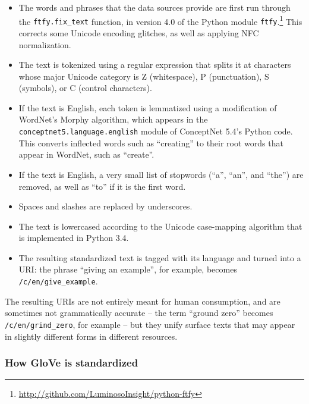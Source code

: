 \documentclass[letterpaper]{article}
\begin{document}
\begin{itemize}
\item The words and phrases that the data sources provide are first run
    through the {\tt ftfy.fix\_text} function, in version 4.0 of the Python
    module {\tt ftfy}.\footnote{
        \url{http://github.com/LuminosoInsight/python-ftfy}
    } This corrects some Unicode encoding glitches, as well as applying
    NFC normalization.
\item The text is tokenized using a regular expression that splits it at
    characters whose major Unicode category is Z (whitespace), P (punctuation),
    S (symbols), or C (control characters).
\item If the text is English, each token is lemmatized using a modification of
    WordNet's Morphy algorithm, which appears in the {\tt conceptnet5.language.english}
    module of ConceptNet 5.4's Python code. This converts inflected words such
    as ``creating'' to their root words that appear in WordNet, such as
    ``create''.
\item If the text is English, a very small list of stopwords (``a'', ``an'',
    and ``the'') are removed, as well as ``to'' if it is the first word.
\item Spaces and slashes are replaced by underscores.
\item The text is lowercased according to the Unicode case-mapping algorithm
    that is implemented in Python 3.4.
\item The resulting standardized text is tagged with its language and turned
    into a URI: the phrase ``giving an example'', for example, becomes
    {\tt /c/en/give\_example}.
\end{itemize}

The resulting URIs are not entirely meant for human consumption, and are
sometimes not grammatically accurate -- the term ``ground zero'' becomes
{\tt /c/en/grind\_zero}, for example -- but they unify surface texts that may
appear in slightly different forms in different resources.

\subsubsection{How GloVe is standardized}
\end{document}
